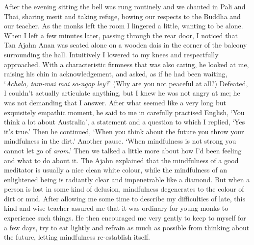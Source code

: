 After the evening sitting the bell was rung routinely and we chanted in
Pali and Thai, sharing merit and taking refuge, bowing our respects to
the Buddha and our teacher. As the monks left the room I lingered a
little, wanting to be alone. When I left a few minutes later, passing
through the rear door, I noticed that Tan Ajahn Anan was seated alone on
a wooden dais in the corner of the balcony surrounding the hall.
Intuitively I lowered to my knees and respectfully approached. With a
characteristic firmness that was also caring, he looked at me, raising
his chin in acknowledgement, and asked, as if he had been waiting,
`\emph{Achalo, tam-mai mai sa-ngop ley?}' (Why are you not peaceful at
all?) Defeated, I couldn't actually articulate anything, but I knew he
was not angry at me; he was not demanding that I answer. After what
seemed like a very long but exquisitely empathic moment, he said to me
in carefully practised English, `You think a lot about Australia', a
statement and a question to which I replied, `Yes it's true.' Then he
continued, `When you think about the future you throw your mindfulness
in the dirt.' Another pause. `When mindfulness is not strong you cannot
let go of \emph{arom}.' Then we talked a little more about how I'd been
feeling and what to do about it. The Ajahn explained that the
mindfulness of a good meditator is usually a nice clean white colour,
while the mindfulness of an enlightened being is radiantly clear and
impenetrable like a diamond. But when a person is lost in some kind of
delusion, mindfulness degenerates to the colour of dirt or mud. After
allowing me some time to describe my difficulties of late, this kind and
wise teacher assured me that it was ordinary for young monks to
experience such things. He then encouraged me very gently to keep to
myself for a few days, try to eat lightly and refrain as much as
possible from thinking about the future, letting mindfulness
re-establish itself.

